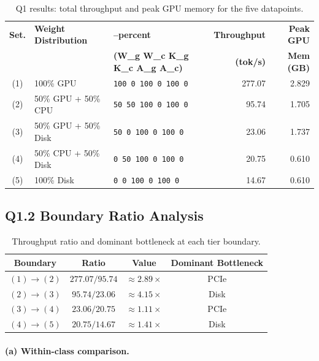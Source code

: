 \documentclass[12pt,a4paper]{article}
\begin{document}
\begin{table}[H]
\centering
\caption{Q1 results: total throughput and peak GPU memory for the five datapoints.}
\small
\begin{tabular}{clp{3.2cm}rr}
\toprule
\textbf{Set.} & \textbf{Weight Distribution} & \textbf{--percent} & \textbf{Throughput} & \textbf{Peak GPU} \\
              &                              & \textbf{(W\_g W\_c K\_g K\_c A\_g A\_c)} & \textbf{(tok/s)} & \textbf{Mem (GB)} \\
\midrule
(1) & 100\% GPU            & \texttt{100 0 100 0 100 0} & 277.07 & 2.829 \\
(2) & 50\% GPU + 50\% CPU  & \texttt{50 50 100 0 100 0} &  95.74 & 1.705 \\
(3) & 50\% GPU + 50\% Disk & \texttt{50 0 100 0 100 0}  &  23.06 & 1.737 \\
(4) & 50\% CPU + 50\% Disk & \texttt{0 50 100 0 100 0}  &  20.75 & 0.610 \\
(5) & 100\% Disk           & \texttt{0 0 100 0 100 0}   &  14.67 & 0.610 \\
\bottomrule
\end{tabular}
\end{table}

\subsection*{Q1.2 Boundary Ratio Analysis}

\begin{table}[H]
\centering
\caption{Throughput ratio and dominant bottleneck at each tier boundary.}
\begin{tabular}{cccc}
\toprule
\textbf{Boundary} & \textbf{Ratio} & \textbf{Value} & \textbf{Dominant Bottleneck} \\
\midrule
$(1)\to(2)$ & $277.07 / 95.74$  & $\approx 2.89\times$ & PCIe \\
$(2)\to(3)$ & $95.74  / 23.06$  & $\approx 4.15\times$ & Disk \\
$(3)\to(4)$ & $23.06  / 20.75$  & $\approx 1.11\times$ & PCIe \\
$(4)\to(5)$ & $20.75  / 14.67$  & $\approx 1.41\times$ & Disk \\
\bottomrule
\end{tabular}
\end{table}

\paragraph{(a) Within-class comparison.}
\end{document}
